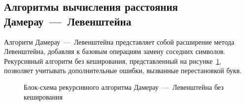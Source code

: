 \subsection{Алгоритмы вычисления расстояния Дамерау~---~Левенштейна}

\noindent
\hspace{0.75cm}
Алгоритм Дамерау~---~Левенштейна представляет собой расширение метода Левенштейна, добавляя к базовым операциям замену соседних символов. Рекурсивный алгоритм без кеширования, представленный на рисунке~\ref{fig:dl_recursion_basic}, позволяет учитывать дополнительные ошибки, вызванные перестановкой букв.

\begin{figure}[H]
    \caption{Блок-схема рекурсивного алгоритма Дамерау~---~Левенштейна без кеширования}
    \label{fig:dl_recursion_basic}
\end{figure}
